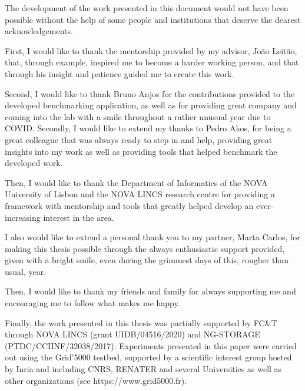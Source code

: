 

\begin{ntacknowledgements}


The development of the work presented in this document would not have been possible without the help of some people and institutions that deserve the dearest acknowledgements.

First, I would like to thank the mentorship provided by my advisor, João Leitão, that, through example, inspired me to become a harder working person, and that through his insight and patience guided me to create this work.

Second, I would like to thank Bruno Anjos for the contributions provided to the developed benchmarking application, as well as for providing great company and coming into the lab with a smile throughout a rather unusual year due to COVID. Secondly, I would like to extend my thanks to Pedro Akos, for being a great colleague that was always ready to step in and help, providing great insights into my work as well as providing tools that helped benchmark the developed work.

Then, I would like to thank the Department of Informatics of the NOVA University of Lisbon and the NOVA LINCS research centre for providing a framework with mentorship and tools that greatly helped develop an ever-increasing interest in the area.

I also would like to extend a personal thank you to my partner, Marta Carlos, for making this thesis possible through the always enthusiastic support provided, given with a bright smile, even during the grimmest days of this, rougher than usual, year.

Then, I would like to thank my friends and family for always supporting me and encouraging me to follow what makes me happy.

Finally, the work presented in this thesis was partially supported by FC\&T through NOVA LINCS (grant UIDB/04516/2020) and NG-STORAGE (PTDC/CCIINF/32038/2017). Experiments presented in this paper were carried out using the Grid’5000 testbed, supported by a scientific interest group hosted by Inria and including CNRS, RENATER and several Universities as well as other organizations (see https://www.grid5000.fr).



\end{ntacknowledgements}